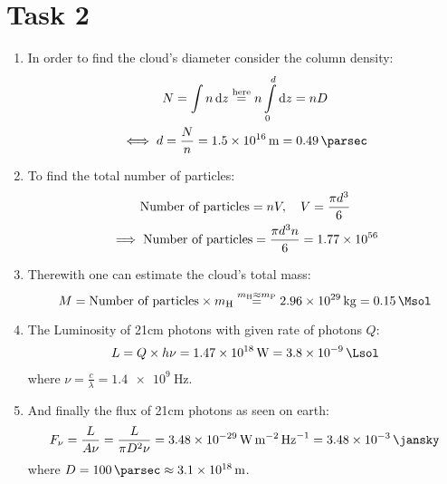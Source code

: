 \documentclass[11pt,a4paper]{scrartcl}
\newcommand{\mH}{\ensuremath{m_{\mathrm{H}}}}
\newcommand{\mP}{\ensuremath{m_{\mathrm{P}}}}
\newcommand{\nop}{\text{Number of particles}}
\begin{document}
\section*{Task 2}

\begin{enumerate}[label=\textbf{\large(\alph*)}, itemsep=2\baselineskip]

\item
    In order to find the cloud's diameter consider the column density:
    \begin{gather*}
        N=\int{n}\dd{z}\overset{\text{here}}{=}n\int\limits_{0}^{d}\dd{z}=nD \\
        \iff{d}=\frac{N}{n}=\SI{1.5e16}{\metre}=\SI{.49}{\parsec}
    \end{gather*}

\item
    To find the total number of particles:
    \begin{gather*}
        \nop=nV\qc{V}=\frac{\pi{d^3}}{6} \\
        \implies\nop=\frac{\pi{d^3}n}{6}=\num{1.77e56}
    \end{gather*}

\item
    Therewith one can estimate the cloud's total mass:
    \begin{equation*}
        M=\nop\times\mH\overset{\mH\approx\mP}{=}\SI{2.96e29}{\kilogram}=\SI{.15}{\Msol}
    \end{equation*}

\item
    The Luminosity of 21cm photons with given rate of photons $Q$:
    \begin{gather*}
        L=Q\times{h}\nu=\SI{1.47e18}{\watt}=\SI{3.8e-9}{\Lsol}
    \end{gather*}
    where $\nu=\frac{c}{\lambda}=\SI{1.4e9}{\hertz}$.

\item
    And finally the flux of 21cm photons as seen on earth:
    \begin{gather*}
        F_{\nu}=\frac{L}{A\nu}=\frac{L}{\pi{D^2}\nu}=\SI{3.48e-29}{\watt\per\metre\squared\per\hertz}
        =\SI{3.48e-3}{\jansky}
    \end{gather*}
    where $D=\SI{100}{\parsec}\approx\SI{3.1e18}{\metre}$.

\end{enumerate}
\end{document}
